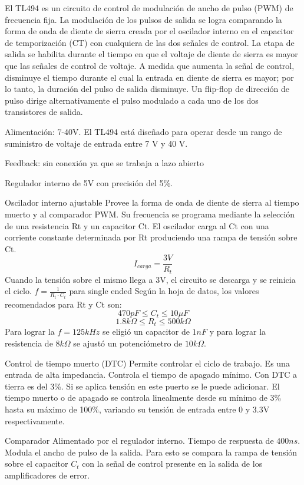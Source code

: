 El TL494 es un circuito de control de modulación de ancho de pulso (PWM) de frecuencia fija. 
La modulación de los pulsos de salida se logra comparando la forma de onda de diente de sierra creada por el oscilador interno en el capacitor de temporización (CT) con cualquiera de las dos señales de control. 
La etapa de salida se habilita durante el tiempo en que el voltaje de diente de sierra es mayor que las señales de control de voltaje. 
A medida que aumenta la señal de control, disminuye el tiempo durante el cual la entrada en diente de sierra es mayor; por lo tanto, la duración del pulso de salida disminuye. 
Un flip-flop de dirección de pulso dirige alternativamente el pulso modulado a cada uno de los dos transistores de salida.

Alimentación: 7-40V.
El TL494 está diseñado para operar desde un rango de suministro de voltaje de entrada entre 7 V y 40 V.

Feedback: sin conexión ya que se trabaja a lazo abierto

Regulador interno de 5V con precisión del 5\%. 

Oscilador interno ajustable 
Provee la forma de onda de diente de sierra al tiempo muerto y al comparador PWM. 
Su frecuencia se programa mediante la selección de una resistencia Rt y un capacitor Ct. 
El oscilador carga al Ct con una corriente constante determinada por Rt produciendo una rampa de tensión sobre Ct.
$$ I_{carga}=\frac{3V}{R_t} $$
Cuando la tensión sobre el mismo llega a 3V, el circuito se descarga y se reinicia el ciclo. 
$f=\frac{1}{R_t\cdot C_t}$ para single ended 
Según la hoja de datos, los valores recomendados para Rt y Ct son:
$$470pF\leq C_t\leq 10\mu F$$
$$1.8k\Omega\leq R_t\leq 500k\Omega$$
Para lograr la $f=125kHz$ se eligió un capacitor de $1nF$ y para lograr la resistencia de $8k\Omega$ se ajustó un potenciómetro de $10k\Omega$. 

Control de tiempo muerto (DTC)
Permite controlar el ciclo de trabajo. 
Es una entrada de alta impedancia. 
Controla el tiempo de apagado mínimo. Con DTC a tierra es del 3\%.
Si se aplica tensión en este puerto se le puede adicionar.
El tiempo muerto o de apagado se controla linealmente desde su mínimo de 3\% hasta su máximo de 100\%, 
variando su tensión de entrada entre 0 y 3.3V respectivamente. 

Comparador 
Alimentado por el regulador interno. 
Tiempo de respuesta de $400ns$. 
Modula el ancho de pulso de la salida. Para esto se compara la rampa de tensión sobre el capacitor $C_t$ con la señal de control
presente en la salida de los amplificadores de error. 


